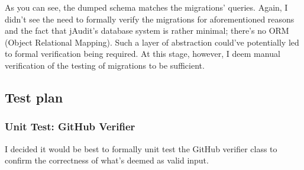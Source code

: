 \documentclass[9pt]{article}
\begin{document}
		As you can see, the dumped schema matches the migrations' queries. Again,
		I didn't see the need to formally verify the migrations for
		aforementioned reasons and the fact that jAudit's database system is
		rather minimal; there's no ORM (Object Relational Mapping). Such a layer
		of abstraction could've potentially led to formal verification being
		required. At this stage, however, I deem manual verification of the
		testing of migrations to be sufficient.\\


	\subsection{Test plan}
		\subsubsection{Unit Test: GitHub Verifier}
			I decided it would be best to formally unit test the GitHub verifier
			class to confirm the correctness of what's deemed as valid input.\\
\end{document}
